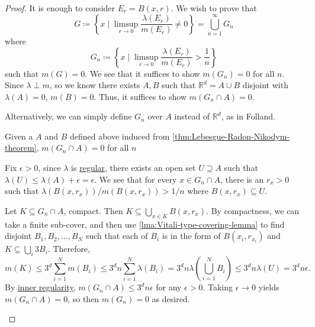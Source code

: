 \begin{proof}
	It is enough to consider \(E_r = B(x,r)\). We wish to prove that
	\[
		G \coloneqq \left\{x \mid \limsup_{r \to 0} \frac{\lambda(E_r)}{m(E_r)} \neq 0\right\}  = \bigcup_{n = 1}^\infty G_n
	\]
	where
	\[
		G_n \coloneqq \left\{x \mid \limsup_{r \to 0} \frac{\lambda(E_r)}{m(E_r)} > \frac{1}{n}\right\}
	\]
	such that \(m(G) = 0\). We see that it suffices to show \(m(G_n) = 0\) for all \(n\). Since \(\lambda \perp m\), so we know there exists \(A, B\) such that
	\(\mathbb{R}^d = A \cup B\) disjoint with \(\lambda(A) = 0\), \(m(B) = 0\). Thus, it suffices to show \(m(G_n \cap A) = 0\).
	\begin{note}
		Alternatively, we can simply define \(G_{n} \) over \(A\) instead of \(\mathbb{R} ^d\), as in Folland\cite{folland1999real}.
	\end{note}

	\begin{claim}
		Given a \(A\) and \(B\) defined above induced from \autoref{thm:Lebesgue-Radon-Nikodym-theorem}, \(m(G_n \cap A) = 0\) for all \(n\)
	\end{claim}
	\begin{explanation}
		Fix \(\epsilon> 0\), since \(\lambda\) is \hyperref[def:regular]{regular}, there exists an open set \(U \supseteq A\) such that \(\lambda(U) \leq \lambda(A) + \epsilon= \epsilon \).
		We see that for every \(x \in G_n \cap A\), there is an \(r_x > 0\) such that \(\lambda(B(x,r_x))/m(B(x,r_x)) > 1/n\) where \(B(x,r_x) \subseteq U\).

		Let \(K \subseteq G_n \cap A\), compact. Then \(K \subseteq \bigcup_{x \in K} B(x,r_x)\). By compactness, we can take a finite sub-cover, and then use
		\autoref{lma:Vitali-type-covering-lemma} to find  disjoint \(B_1,B_2,\dots,B_N\) such that each of \(B_{i} \) is in the form of \(B(x_i,r_{x_i})\) and
		\(K \subseteq \bigcup_i 3B_i\). Therefore,
		\[
			m(K) \leq 3^d \sum_{i=1}^N m(B_i) \leq 3^dn\sum_{i=1}^N \lambda(B_i) = 3^d n\lambda\left( \bigcup_{i=1}^N B_i \right) \leq 3^dn\lambda(U) = 3^dn \epsilon .
		\]
		By \hyperref[thm:inner-regularity]{inner regularity}, \(m(G_n \cap A) \leq 3^d n\epsilon\) for any \(\epsilon> 0\). Taking \(\epsilon\to 0\) yields \(m(G_n \cap A) = 0\), so then \(m(G_n) = 0\) as desired.
	\end{explanation}
\end{proof}
